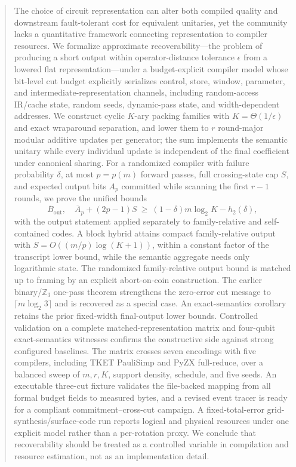 \documentclass[aps,prx,reprint,floatfix,superscriptaddress]{revtex4-2}
\begin{document}
\begin{abstract}
The choice of circuit representation can alter both compiled quality and
downstream fault-tolerant cost for equivalent unitaries, yet the community
lacks a quantitative framework connecting representation to compiler
resources. We formalize approximate recoverability---the problem of
producing a short output within operator-distance tolerance
$\epsilon$ from a lowered flat representation---under a budget-explicit
compiler model whose bit-level cut budget explicitly serializes control,
store, window, parameter, and intermediate-representation channels,
including random-access IR/cache state, random seeds, dynamic-pass state,
and width-dependent addresses. We construct cyclic $K$-ary packing
families with $K=\Theta(1/\epsilon)$ and exact wraparound separation, and
lower them to $r$ round-major modular additive updates per generator; the
sum implements the semantic unitary while every individual update is
independent of the final coefficient under canonical sharing.  For a
randomized compiler with failure probability $\delta$, at most $p=p(m)$
forward passes, full crossing-state cap $S$, and expected output bits $A_p$
committed while scanning the first $r-1$ rounds, we prove the unified bounds
\begin{equation*}
 \overline B_{\mathrm{out}},\quad
 \overline A_p+(2p-1)S
 \ \geq\ (1-\delta)m\log_2K-h_2(\delta),
\end{equation*}
with the output statement applied separately to family-relative and
self-contained codes. A block hybrid attains compact family-relative output
with $S=O((m/p)\log(K+1))$, within a constant factor of the transcript
lower bound, while the semantic aggregate needs only logarithmic state.
The randomized family-relative output bound is matched up to framing by an
explicit abort-on-coin construction.  The earlier binary/$\mathbb Z_3$
one-pass theorem strengthens the zero-error cut message to
$\lceil m\log_2 3\rceil$ and is recovered as a special case. An exact-semantics
corollary retains the prior fixed-width final-output lower bounds.
Controlled validation on a complete matched-representation matrix
and four-qubit exact-semantics witnesses confirms the constructive side
against strong configured baselines.  The matrix crosses seven encodings
with five compilers, including TKET PauliSimp and PyZX full-reduce, over a
balanced sweep of $m,r,K$, support density, schedule, and five seeds.
An executable three-cut fixture validates the file-backed mapping from all
formal budget fields to measured bytes, and a revised event tracer is ready for
a compliant commitment--cross-cut campaign.  A
fixed-total-error grid-synthesis/surface-code run reports logical and physical
resources under one explicit model rather than a per-rotation proxy. We conclude that recoverability
should be treated as a controlled variable in compilation and resource
estimation, not as an implementation detail.
\end{abstract}
\maketitle
\end{document}
